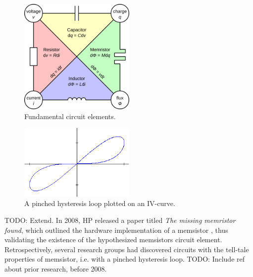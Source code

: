 \begin{figure}[htbp]
	\begin{center}
		\includegraphics[width=0.5\textwidth]{inc/circuit_elements.png}
		\caption{Fundamental circuit elements.\protect\footnotemark}
		\label{fig:circuit_elements}
	\end{center}
\end{figure}

\begin{figure}[htbp]
	\begin{center}
		\includegraphics[width=0.5\textwidth]{inc/pinched_hysteresis.png}
		\caption{A pinched hysteresis loop plotted on an IV-curve.\protect\footnotemark}
		\label{fig:pinched_hysteresis}
	\end{center}
\end{figure}

TODO: Extend. In 2008, HP released a paper titled \textit{The missing memristor found}, which outlined the hardware implementation of a memsistor \cite{hp_memristor_found}, thus validating the existence of the hypothesized memsistors circuit element. Retrospectively, several research groups had discovered circuits with the tell-tale properties of memsistor, i.e. with a pinched hysteresis loop. TODO: Include ref about prior research, before 2008.

